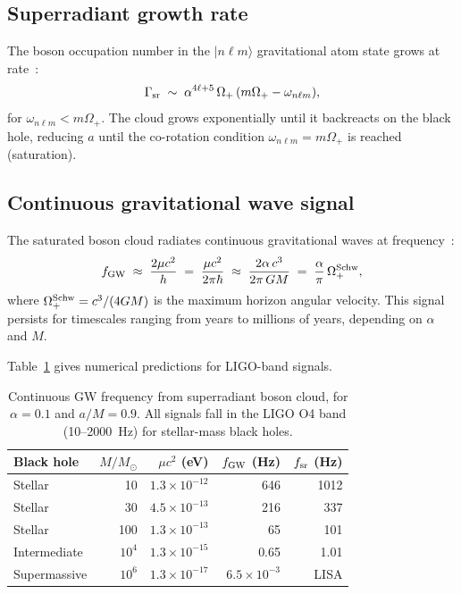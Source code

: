 \documentclass[12pt]{article}
\newcommand{\Oplus}{\Omega_+}
\begin{document}
\subsection{Superradiant growth rate}

The boson occupation number in the $|n\ell m\rangle$ gravitational
atom state grows at rate~\cite{detweiler1980,dolan2007}:
\begin{equation}
  \Gamma_{\rm sr} \;\sim\; \alpha^{4\ell+5}\,\Oplus\,(m\Oplus - \omega_{n\ell m}),
  \label{eq:growth_rate}
\end{equation}
for $\omega_{n\ell m} < m\Oplus$.  The cloud grows exponentially until
it backreacts on the black hole, reducing $a$ until the co-rotation
condition $\omega_{n\ell m} = m\Oplus$ is reached (saturation).

\subsection{Continuous gravitational wave signal}

The saturated boson cloud radiates continuous gravitational waves at
frequency~\cite{arvanitaki2015}:
\begin{equation}
  f_{\rm GW} \;\approx\; \frac{2\mu c^2}{h}
  \;=\; \frac{\mu c^2}{2\pi\hbar}
  \;\approx\; \frac{2\alpha\,c^3}{2\pi\,GM}
  \;=\; \frac{\alpha}{\pi}\,\Oplus^{\rm Schw},
  \label{eq:fGW}
\end{equation}
where $\Oplus^{\rm Schw} = c^3/(4GM)$ is the maximum horizon angular
velocity.  This signal persists for timescales ranging from years
to millions of years, depending on $\alpha$ and $M$.

Table~\ref{tab:bosons} gives numerical predictions for LIGO-band signals.

\begin{table}[h]
\centering
\caption{Continuous GW frequency from superradiant boson cloud,
for $\alpha = 0.1$ and $a/M = 0.9$.  All signals fall in the LIGO O4
band (10--2000~Hz) for stellar-mass black holes.}
\label{tab:bosons}
\renewcommand{\arraystretch}{1.3}
\begin{tabular}{@{}lrrrr@{}}
\toprule
Black hole & $M/M_\odot$ & $\mu c^2$ (eV) & $f_{\rm GW}$ (Hz)
  & $f_{\rm sr}$ (Hz) \\
\midrule
Stellar    &  10 & $1.3\times10^{-12}$ &  646 & 1012 \\
Stellar    &  30 & $4.5\times10^{-13}$ &  216 &  337 \\
Stellar    & 100 & $1.3\times10^{-13}$ &   65 &  101 \\
Intermediate & $10^4$ & $1.3\times10^{-15}$ & 0.65 & 1.01 \\
Supermassive & $10^6$ & $1.3\times10^{-17}$ & $6.5\times10^{-3}$ & LISA \\
\bottomrule
\end{tabular}
\end{table}
\end{document}
